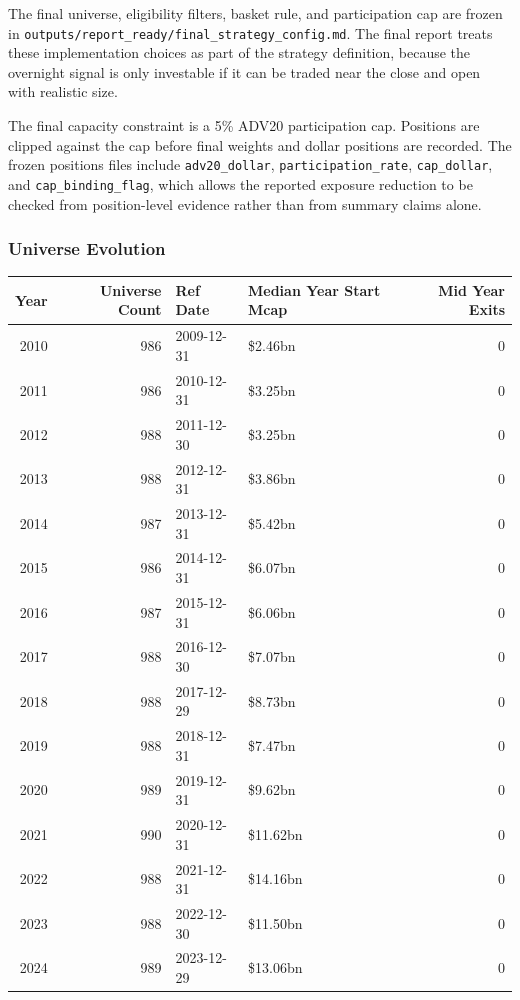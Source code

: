 \documentclass[
]{article}
\begin{document}
The final universe, eligibility filters, basket rule, and participation
cap are frozen in
\texttt{outputs/report\_ready/final\_strategy\_config.md}. The final
report treats these implementation choices as part of the strategy
definition, because the overnight signal is only investable if it can be
traded near the close and open with realistic size.

The final capacity constraint is a 5\% ADV20 participation cap.
Positions are clipped against the cap before final weights and dollar
positions are recorded. The frozen positions files include
\texttt{adv20\_dollar}, \texttt{participation\_rate},
\texttt{cap\_dollar}, and \texttt{cap\_binding\_flag}, which allows the
reported exposure reduction to be checked from position-level evidence
rather than from summary claims alone.

\hypertarget{universe-evolution}{%
\subsubsection{Universe Evolution}\label{universe-evolution}}

\begin{longtable}[]{@{}rrllr@{}}
\toprule
Year & Universe Count & Ref Date & Median Year Start Mcap & Mid Year
Exits \\
\midrule
\endhead
2010 & 986 & 2009-12-31 & \$2.46bn & 0 \\
2011 & 986 & 2010-12-31 & \$3.25bn & 0 \\
2012 & 988 & 2011-12-30 & \$3.25bn & 0 \\
2013 & 988 & 2012-12-31 & \$3.86bn & 0 \\
2014 & 987 & 2013-12-31 & \$5.42bn & 0 \\
2015 & 986 & 2014-12-31 & \$6.07bn & 0 \\
2016 & 987 & 2015-12-31 & \$6.06bn & 0 \\
2017 & 988 & 2016-12-30 & \$7.07bn & 0 \\
2018 & 988 & 2017-12-29 & \$8.73bn & 0 \\
2019 & 988 & 2018-12-31 & \$7.47bn & 0 \\
2020 & 989 & 2019-12-31 & \$9.62bn & 0 \\
2021 & 990 & 2020-12-31 & \$11.62bn & 0 \\
2022 & 988 & 2021-12-31 & \$14.16bn & 0 \\
2023 & 988 & 2022-12-30 & \$11.50bn & 0 \\
2024 & 989 & 2023-12-29 & \$13.06bn & 0 \\
\bottomrule
\end{longtable}
\end{document}
